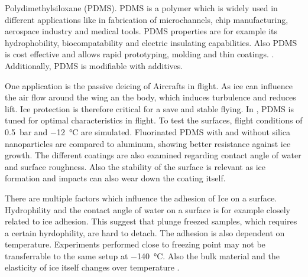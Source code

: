 Polydimethylsiloxane (PDMS). PDMS is a polymer which is widely used in different applications like in fabrication of microchannels, chip manufacturing, aerospace industry and medical tools. PDMS properties are for example its hydrophobility, biocompatability and electric insulating capabilities. Also PDMS is cost effective and allows rapid prototyping, molding and thin coatings. \cite{Wolf.2018}. Additionally, PDMS is modifiable with additives.

One application is the passive deicing of Aircrafts in flight. As ice can influence the air flow around the wing an the body, which induces turbulence and reduces lift. Ice protection is therefore critical for a save and stable flying. In \cite{Liu.2018}, PDMS is tuned for optimal characteristics in flight. To test the surfaces, flight conditions of \SI{0.5}{\bar} and \SI{-12}{\degreeCelsius} are simulated. Fluorinated PDMS with and without silica nanoparticles are compared to aluminum, showing better resistance against ice growth. The different coatings are also examined regarding contact angle of water and surface roughness. Also the stability of the surface is relevant as ice formation and impacts can also wear down the coating itself. 

There are multiple factors which influence the adhesion of Ice on a surface. Hydrophility and the contact angle of water on a surface is for example closely related to ice adhesion. This suggest that plunge freezed samples, which requires a certain hyrdophility, are hard to detach. The adhesion is also dependent on temperature. Experiments performed close to freezing point may not be transferrable to the same setup at \SI{-140}{\degreeCelsius}. Also the bulk material and the elasticity of ice itself changes over temperature \cite{Makkonen.2012}.
